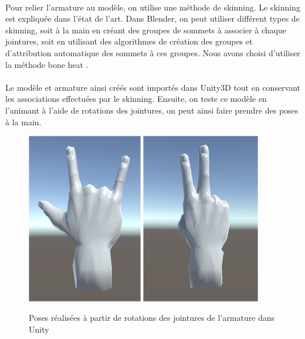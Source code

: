 \paragraph{}
Pour relier l'armature au modèle, on utilise une méthode de skinning. Le skinning est expliquée dans l'état de l'art. Dans Blender, on peut utiliser différent types de skinning, 
soit \og à la main \fg en créant des groupes de sommets à associer à chaque jointures, soit en utilisant des algorithmes de création des groupes et d'attribution automatique des 
sommets à ces groupes. Nous avons choisi d'utiliser la méthode \og bone heat \fg. \cite{baran2007automatic}

\paragraph{}
Le modèle et armature ainsi créés sont importés dans Unity3D tout en conservant les associations effectuées par le skinning. Ensuite, on teste ce modèle en l'animant à l'aide de 
rotations des jointures, on peut ainsi faire prendre des poses à la main. 

\begin{figure}[!h]
	\centering
	\includegraphics[width=0.45\textwidth]{images/HandPose1.png}
	\includegraphics[width=0.46\textwidth]{images/HandPose2.png}
	\caption{Poses réalisées à partir de rotations des jointures de l'armature dans Unity}
\end{figure}


